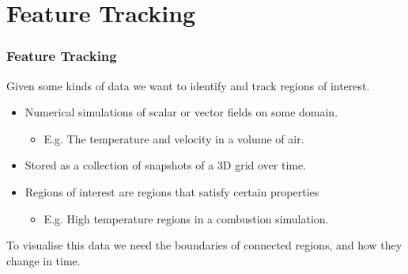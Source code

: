 \documentclass[11pt]{beamer}
\begin{document}

\section[Feature Tracking]{Feature Tracking}
\begin{frame}
	\frametitle{Feature Tracking}
	
	Given some kinds of data we want to identify and track regions of interest.

	\pause
	\begin{itemize}
		\item Numerical simulations of scalar or vector fields on some domain.
		\begin{itemize}
			\item E.g. The temperature and velocity in a volume of air.
		\end{itemize}

		\pause
		\item Stored as a collection of snapshots of a 3D grid over time.

		\pause
		\item Regions of interest are regions that satisfy certain properties
		\begin{itemize}
			\item E.g. High temperature regions in a combustion simulation.
		\end{itemize}
	\end{itemize}

	\pause
	To visualise this data we need the boundaries of connected regions, and how they change in time.
\end{frame}
\end{document}
